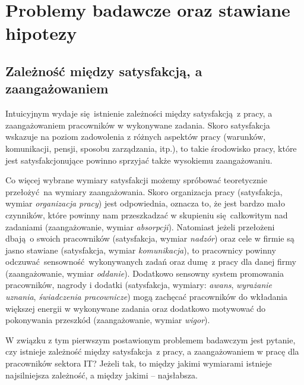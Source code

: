 \chapter{Problemy badawcze oraz stawiane hipotezy}
\section{Zależność między satysfakcją, a zaangażowaniem}
\label{sec:hypothesis-relation}
Intuicyjnym wydaje się istnienie zależności między satysfakcją z pracy, a zaangażowaniem pracowników w wykonywane zadania. Skoro satysfakcja wskazuje na poziom zadowolenia z różnych aspektów pracy (warunków, komunikacji, pensji, sposobu zarządzania, itp.), to takie środowisko pracy, które jest satysfakcjonujące powinno sprzyjać także wysokiemu zaangażowaniu. 

Co więcej wybrane wymiary satysfakcji możemy spróbować teoretycznie przełożyć na wymiary zaangażowania. Skoro organizacja pracy (satysfakcja, wymiar \textit{organizacja pracy}) jest odpowiednia, oznacza to, że jest bardzo mało czynników, które powinny nam przeszkadzać w skupieniu
się całkowitym nad zadaniami (zaangażowanie, wymiar \textit{absorpcji}). Natomiast jeżeli przełożeni dbają o swoich pracowników (satysfakcja, wymiar \textit{nadzór}) oraz cele w firmie są jasno stawiane (satysfakcja, wymiar \textit{komunikacja}), to pracownicy powinny odczuwać sensowność wykonywanych zadań oraz dumę z pracy dla danej firmy (zaangażowanie, wymiar \textit{oddanie}). Dodatkowo sensowny system promowania pracowników, nagrody i dodatki (satysfakcja, wymiary: \textit{awans},
\textit{wyrażanie uznania}, \textit{świadczenia pracownicze}) mogą zachęcać pracowników do wkładania większej energii w wykonywane zadania oraz dodatkowo motywować do pokonywania przeszkód (zaangażowanie, wymiar \textit{wigor}).

W związku z tym pierwszym postawionym problemem badawczym jest pytanie, czy istnieje zależność między satysfakcja z pracy, a zaangażowaniem w pracę dla pracowników sektora IT? Jeżeli tak, to między jakimi wymiarami istnieje najsilniejsza zależność, a między jakimi -- najsłabsza.

